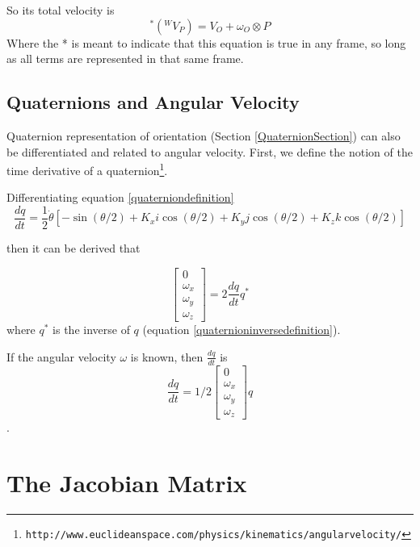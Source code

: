 So its total velocity is
\[
^*(^WV_P) = V_O + \omega_O\otimes P
\]
Where the * is meant to indicate that this equation is true in any frame,
so long as all terms are represented in that same frame.





\subsection{Quaternions and Angular Velocity}

Quaternion representation of orientation (Section \ref{QuaternionSection})  can also be differentiated and related to angular velocity.  First, we define the notion of the time derivative of a quaternion\footnote{\small\tt http://www.euclideanspace.com/physics/kinematics/angularvelocity/}.

Differentiating equation \ref{quaterniondefinition}
\[
\frac{dq}{dt} =  \frac{1}{2} \dot{\theta} \left [ -\sin(\theta/2) + K_xi\cos(\theta/2)+K_yj\cos(\theta/2)+K_zk\cos(\theta/2) \right]
\]

then it can be derived that

\[
\begin{bmatrix} 0 \\ \omega_x \\ \omega_y \\ \omega_z \end{bmatrix} = 2\frac{dq}{dt}q^*
\]
where $q^*$ is the inverse of $q$ (equation \ref{quaternioninversedefinition}).

If the angular velocity $\omega$ is known, then $\frac{dq}{dt}$ is
\[
\frac{dq}{dt} = 1/2 \begin{bmatrix} 0 \\ \omega_x \\ \omega_y \\ \omega_z \end{bmatrix} q
\]
.




\section{The Jacobian Matrix}
